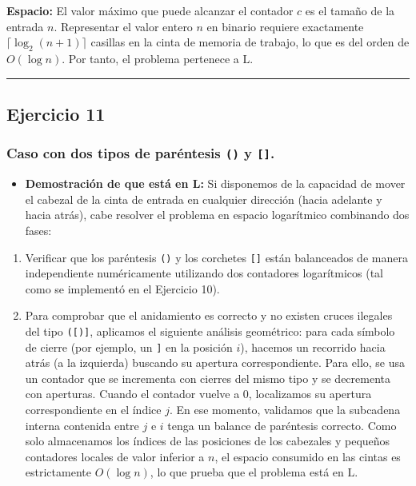 \documentclass[12pt]{book} %
\providecommand{\tightlist}{%
  \setlength{\itemsep}{0pt}\setlength{\parskip}{0pt}}
\begin{document}
\textbf{Espacio:} El valor máximo que puede alcanzar el contador \(c\)
es el tamaño de la entrada \(n\). Representar el valor entero \(n\) en
binario requiere exactamente \(\lceil \log_2(n+1) \rceil\) casillas en
la cinta de memoria de trabajo, lo que es del orden de
\textbf{\(O(\log n)\)}. Por tanto, el problema pertenece a \(\text{L}\).

\begin{center}\rule{0.5\linewidth}{0.5pt}\end{center}

\hypertarget{ejercicio-11}{%
\subsection{Ejercicio 11}\label{ejercicio-11}}

\hypertarget{caso-con-dos-tipos-de-paruxe9ntesis-y-.}{%
\subsubsection{\texorpdfstring{Caso con dos tipos de paréntesis
\texttt{()} y
\texttt{{[}{]}}.}{Caso con dos tipos de paréntesis () y {[}{]}.}}\label{caso-con-dos-tipos-de-paruxe9ntesis-y-.}}

\begin{itemize}
\tightlist
\item
  \textbf{Demostración de que está en L:} Si disponemos de la capacidad
  de mover el cabezal de la cinta de entrada en cualquier dirección
  (hacia adelante y hacia atrás), cabe resolver el problema en espacio
  logarítmico combinando dos fases:
\end{itemize}

\begin{enumerate}
\def\labelenumi{\arabic{enumi}.}
\tightlist
\item
  Verificar que los paréntesis \texttt{()} y los corchetes
  \texttt{{[}{]}} están balanceados de manera independiente
  numéricamente utilizando dos contadores logarítmicos (tal como se
  implementó en el Ejercicio 10).
\item
  Para comprobar que el anidamiento es correcto y no existen cruces
  ilegales del tipo \texttt{({[}){]}}, aplicamos el siguiente análisis
  geométrico: para cada símbolo de cierre (por ejemplo, un \texttt{{]}}
  en la posición \(i\)), hacemos un recorrido hacia atrás (a la
  izquierda) buscando su apertura correspondiente. Para ello, se usa un
  contador que se incrementa con cierres del mismo tipo y se decrementa
  con aperturas. Cuando el contador vuelve a 0, localizamos su apertura
  correspondiente en el índice \(j\). En ese momento, validamos que la
  subcadena interna contenida entre \(j\) e \(i\) tenga un balance de
  paréntesis correcto. Como solo almacenamos los índices de las
  posiciones de los cabezales y pequeños contadores locales de valor
  inferior a \(n\), el espacio consumido en las cintas es estrictamente
  \textbf{\(O(\log n)\)}, lo que prueba que el problema está en
  \(\text{L}\).
\end{enumerate}
\end{document}
